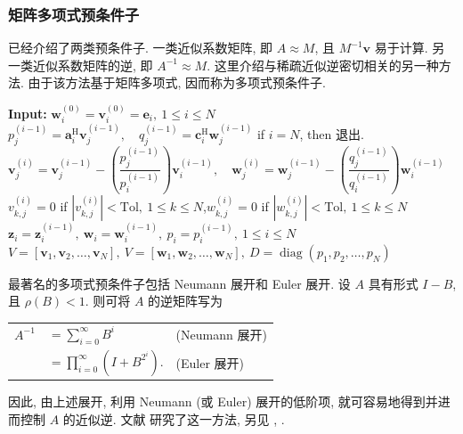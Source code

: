 \subsubsection{{矩阵多项式预条件子}}\label{subsec:polynomial-preconditioners}
{已经介绍了两类预条件子. 一类近似系数矩阵, 即 $A\approx M$, 且 $M^{-1}\bm v$ 易于计算. 另一类近似系数矩阵的逆, 即 $A^{-1}\approx M$. 这里介绍与稀疏近似逆密切相关的另一种方法. 由于该方法基于矩阵多项式, 因而称为多项式预条件子.}
\begin{algorithm}[H]\caption{{AINV 预条件子}}\label{alg:ainv}\begin{algorithmic}[1]
\Statex\textbf{Input:} $\bm w_i^{(0)}=\bm v_i^{(0)}=\bm e_i,\ 1\le i\le N$
\State $p_j^{(i-1)}=\bm a_i^{\mathrm H}\bm v_j^{(i-1)},\quad q_j^{(i-1)}=\bm c_i^{\mathrm H}\bm w_j^{(i-1)}$
\EndFor
\State if $i=N$, then {退出}.
\State $\bm v_j^{(i)}=\bm v_j^{(i-1)}-\left(\dfrac{p_j^{(i-1)}}{p_i^{(i-1)}}\right)\bm v_i^{(i-1)},\quad\bm w_j^{(i)}=\bm w_j^{(i-1)}-\left(\dfrac{q_j^{(i-1)}}{q_i^{(i-1)}}\right)\bm w_i^{(i-1)}$
\State $v_{k,j}^{(i)}=0$ if $|v_{k,j}^{(i)}|<\mathrm{Tol},\ 1\le k\le N$,\quad $w_{k,j}^{(i)}=0$ if $|w_{k,j}^{(i)}|<\mathrm{Tol},\ 1\le k\le N$
\EndFor\EndFor
\State $\bm z_i=\bm z_i^{(i-1)},\ \bm w_i=\bm w_i^{(i-1)},\ p_i=p_i^{(i-1)},\ 1\le i\le N$
\State $V=[\bm v_1,\bm v_2,\ldots,\bm v_N],\ V=[\bm w_1,\bm w_2,\ldots,\bm w_N],\ D=\operatorname{diag}(p_1,p_2,\ldots,p_N)$
\end{algorithmic}\end{algorithm}
{\leavevmode{}\label{idx:chapter-03-section-05:neumann-euler-preconditioners}最著名的多项式预条件子包括 Neumann 展开和 Euler 展开. 设 $A$ 具有形式 $I-B$, 且 $\rho(B)<1$. 则可将 $A$ 的逆矩阵写为}
\begin{center}\begin{tabular}{r@{}ll}
$A^{-1}$&$=\displaystyle\sum_{i=0}^{\infty}B^i$&{(Neumann 展开)}\\[8pt]
&$=\displaystyle\prod_{i=0}^{\infty}(I+B^{2^i}).$&{(Euler 展开)}
\end{tabular}\end{center}
{因此, 由上述展开, 利用 Neumann (或 Euler) 展开的低阶项, 就可容易地得到并进而控制 $A$ 的近似逆. 文献  研究了这一方法, 另见 , .}

